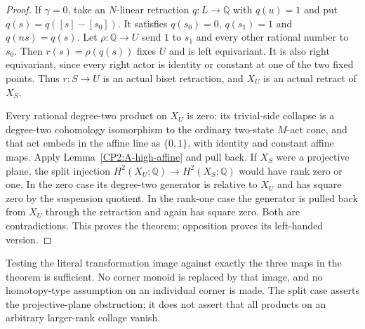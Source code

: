 \begin{proof}
If $\gamma=0$, take an $N$-linear retraction
$q:L\to\mathbb Q$ with $q(u)=1$ and put
$q(s)=q([s]-[s_0])$. It satisfies
$q(s_0)=0$, $q(s_1)=1$ and $q(ns)=q(s)$.
Let $\rho:\mathbb Q\to U$ send $1$ to $s_1$ and every other
rational number to $s_0$. Then $r(s)=\rho(q(s))$ fixes $U$
and is left equivariant. It is also right equivariant, since
every right actor is identity or constant at one of the two
fixed points. Thus $r:S\to U$ is an actual biset retraction,
and $X_U$ is an actual retract of $X_S$.

Every rational degree-two product on $X_U$ is zero: its
trivial-side collapse is a degree-two cohomology isomorphism
to the ordinary two-state $M$-act cone, and that act embeds
in the affine line as $\{0,1\}$, with identity and constant
affine maps. Apply Lemma~\ref{CP2:A-high-affine} and pull back.
If $X_S$ were a projective plane, the split injection
$H^2(X_U;\mathbb Q)\to H^2(X_S;\mathbb Q)$ would have rank
zero or one. In the zero case its degree-two generator is
relative to $X_U$ and has square zero by the suspension
quotient. In the rank-one case the generator is pulled back
from $X_U$ through the retraction and again has square zero.
Both are contradictions. This proves the theorem; opposition
proves its left-handed version.
\end{proof}

\begin{remark*}
Testing the literal transformation image against exactly the
three maps in the theorem is sufficient. No corner monoid is
replaced by that image, and no homotopy-type assumption on
an individual corner is made. The split case asserts the
projective-plane obstruction; it does not assert that all
products on an arbitrary larger-rank collage vanish.
\end{remark*}
